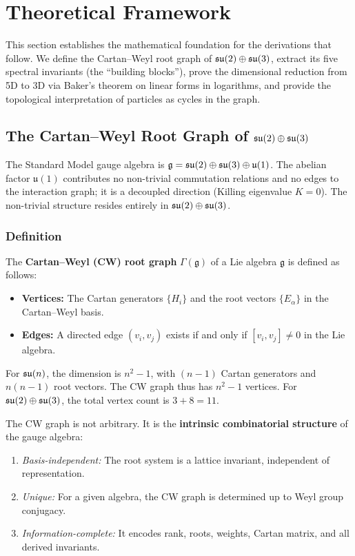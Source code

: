 \section{Theoretical Framework}\label{sec:theoretical_framework}

This section establishes the mathematical foundation for the derivations that follow. We define the Cartan--Weyl root graph of $\mathfrak{su}(2) \oplus \mathfrak{su}(3)$, extract its five spectral invariants (the ``building blocks''), prove the dimensional reduction from 5D to 3D via Baker's theorem on linear forms in logarithms, and provide the topological interpretation of particles as cycles in the graph.

\subsection{The Cartan--Weyl Root Graph of $\mathfrak{su}(2) \oplus \mathfrak{su}(3)$}\label{sec:cw_graph}

The Standard Model gauge algebra is $\mathfrak{g} = \mathfrak{su}(2) \oplus \mathfrak{su}(3) \oplus \mathfrak{u}(1)$. The abelian factor $\mathfrak{u}(1)$ contributes no non-trivial commutation relations and no edges to the interaction graph; it is a decoupled direction (Killing eigenvalue $K = 0$). The non-trivial structure resides entirely in $\mathfrak{su}(2) \oplus \mathfrak{su}(3)$.

\subsubsection{Definition}

The \textbf{Cartan--Weyl (CW) root graph} $\Gamma(\mathfrak{g})$ of a Lie algebra $\mathfrak{g}$ is defined as follows:
\begin{itemize}
\item \textbf{Vertices:} The Cartan generators $\{H_i\}$ and the root vectors $\{E_\alpha\}$ in the Cartan--Weyl basis.
\item \textbf{Edges:} A directed edge $(v_i, v_j)$ exists if and only if $[v_i, v_j] \neq 0$ in the Lie algebra.
\end{itemize}

For $\mathfrak{su}(n)$, the dimension is $n^2 - 1$, with $(n-1)$ Cartan generators and $n(n-1)$ root vectors. The CW graph thus has $n^2 - 1$ vertices. For $\mathfrak{su}(2) \oplus \mathfrak{su}(3)$, the total vertex count is $3 + 8 = 11$.

The CW graph is not arbitrary. It is the \textbf{intrinsic combinatorial structure} of the gauge algebra:
\begin{enumerate}
\item \textit{Basis-independent:} The root system is a lattice invariant, independent of representation.
\item \textit{Unique:} For a given algebra, the CW graph is determined up to Weyl group conjugacy.
\item \textit{Information-complete:} It encodes rank, roots, weights, Cartan matrix, and all derived invariants.
\end{enumerate}

